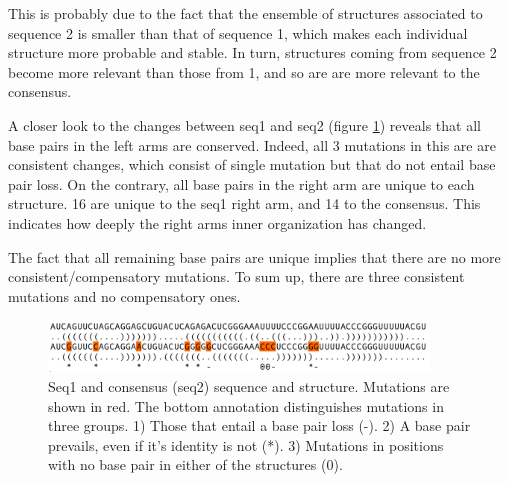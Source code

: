 \documentclass[10pt,a4paper]{article}
\begin{document}
This is probably due to the fact that the ensemble of structures associated to sequence 2 is smaller than that of sequence 1, which makes each individual structure more probable and stable. In turn, structures coming from sequence 2 become more relevant than those from 1, and so are are more relevant to the consensus.

A closer look to the changes between seq1 and seq2 (figure \ref{fig:mutations}) reveals that all base pairs in the left arms are conserved. Indeed, all 3 mutations in this are are consistent changes, which consist of single mutation but that do not entail base pair loss. On the contrary, all base pairs in the right arm are unique to each structure. 16 are unique to the seq1 right arm, and 14 to the consensus. This indicates how deeply the right arm\textquotesingle s inner organization has changed.

The fact that all remaining base pairs are unique implies that there are no more consistent/compensatory mutations. To sum up, there are three consistent mutations and no compensatory ones.

\newpage

\begin{figure}[!h]
\includegraphics[width = 0.9\textwidth]{figures/mutations.png}
\caption{Seq1 and consensus (seq2) sequence and structure. Mutations are shown in red. The bottom annotation distinguishes mutations in three groups. 1) Those that entail a base pair loss (-). 2) A base pair prevails, even if it's identity is not (*). 3) Mutations in positions with no base pair in either of the structures (0).}
\label{fig:mutations}
\end{figure}
\end{document}
